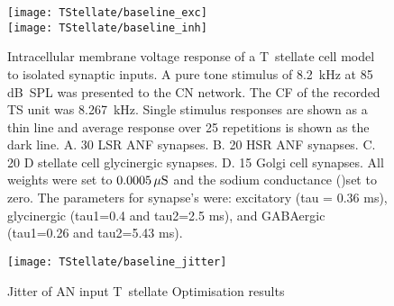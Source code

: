 \begin{figure}[htb]
\centering%
\texttt{[image: TStellate/baseline\_exc]}\\
\texttt{[image: TStellate/baseline\_inh]}
\caption[Response of T~stellate cells to isolated synaptic inputs]%
{Intracellular membrane voltage response of a T~stellate cell model to isolated synaptic inputs.
A pure tone stimulus of 8.2~kHz at 85 dB~SPL was presented to the CN network. The CF of the recorded TS unit was 8.267~kHz.
Single stimulus responses are shown as a thin line and average response over 25 repetitions is shown as the dark line.
A. 30 LSR ANF synapses.
B. 20 HSR ANF synapses.
C. 20 D stellate cell glycinergic synapses.
D. 15 Golgi cell \GABAa synapses.
All weights were set to $0.0005\,\mu{\rm S}$ and the sodium conductance (\gNa)set to zero.
The parameters for synapse's were: excitatory (tau = 0.36 ms), glycinergic (tau1=0.4 and tau2=2.5 ms), and GABAergic (tau1=0.26 and tau2=5.43 ms).\label{fig:TSinputs}}
\end{figure}

\begin{figure}[htb]
\centering%
\texttt{[image: TStellate/baseline\_jitter]}
\caption[]{Jitter of AN input T~stellate Optimisation results}\label{fig:CSjitter}
\end{figure}





